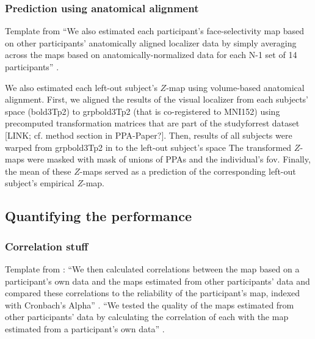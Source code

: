 \subsubsection{Prediction using anatomical alignment}




Template from \citet{jiahui2020predicting} ``We also estimated each
participant's face-selectivity map based on other participants' anatomically
aligned localizer data by simply averaging across the maps based on
anatomically-normalized data for each N-1 set of 14 participants''
\citep{jiahui2020predicting}.

%
We also estimated each left-out subject's $Z$-map using volume-based anatomical
alignment.
First, we aligned the results of the visual localizer from each subjects' space
(bold3Tp2) to grpbold3Tp2 (that is co-registered to MNI152) using precomputed
transformation matrices that are part of the studyforrest dataset [LINK; cf.
method section in PPA-Paper?].
Then, results of all subjects were warped from grpbold3Tp2 in to the left-out
subject's space
%
The transformed $Z$-maps were masked with mask of unions of PPAs and the
individual's \ac{fov}.
%
Finally, the mean of these $Z$-maps served as a prediction of the corresponding
left-out subject's empirical $Z$-map.


\subsection{Quantifying the performance}


\subsubsection{Correlation stuff}
%
Template from \citet{jiahui2020predicting}: ``We then calculated correlations
between the map based on a participant's own data and the maps estimated from
other participants' data and compared these correlations to the reliability of
the participant's map, indexed with Cronbach's Alpha''
\citep{jiahui2020predicting}.
%
``We tested the quality of the maps estimated from other participants' data by
calculating the correlation of each with the map estimated from a participant's
own data'' \citep{jiahui2020predicting}.


